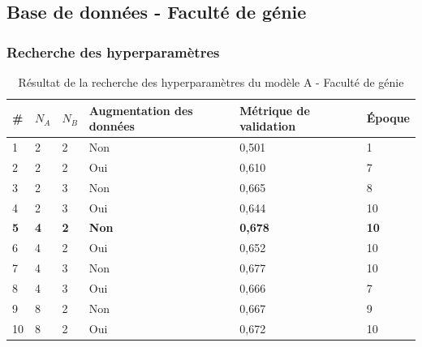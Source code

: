 \subsection{Base de données - Faculté de génie}

\subsubsection{Recherche des hyperparamètres}
    \begin{table}[H]
        \centering
        \caption{Résultat de la recherche des hyperparamètres du modèle A - Faculté de génie}
        \label{tab:resultat_corridor_modele_a}
        \begin{tabular}{lllp{3cm}p{3cm}l}
            \midrule
            \# & \(N_A\) & \(N_B\) & Augmentation des données & Métrique de validation & Époque\\
            \midrule\midrule
            1  & 2 & 2 & Non & 0,501 & 1\\
            2  & 2 & 2 & Oui & 0,610 & 7\\
            3  & 2 & 3 & Non & 0,665 & 8\\
            4  & 2 & 3 & Oui & 0,644 & 10\\
            \textbf{5}  & \textbf{4} & \textbf{2} & \textbf{Non} & \textbf{0,678} & \textbf{10}\\
            6  & 4 & 2 & Oui & 0,652 & 10\\
            7  & 4 & 3 & Non & 0,677 & 10\\
            8  & 4 & 3 & Oui & 0,666 & 7\\
            9  & 8 & 2 & Non & 0,667 & 9\\
            10 & 8 & 2 & Oui & 0,672 & 10\\
            \midrule
        \end{tabular}
    \end{table}
    
